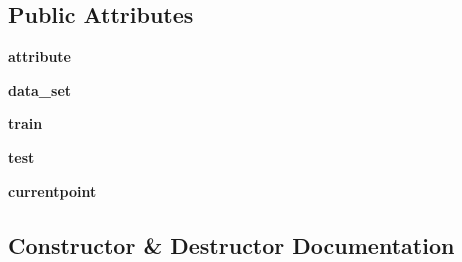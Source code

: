 \subsection*{Public Attributes}
\begin{DoxyCompactItemize}
\item 
{\bfseries attribute}\hypertarget{classSAD_1_1Stream__Generator_1_1Timestamp__Dataset__Generator_1_1Timestamp__Dataset__Generator_a77dc048aff9875af9d478bfa6d5c680a}{}\label{classSAD_1_1Stream__Generator_1_1Timestamp__Dataset__Generator_1_1Timestamp__Dataset__Generator_a77dc048aff9875af9d478bfa6d5c680a}

\item 
{\bfseries data\+\_\+set}\hypertarget{classSAD_1_1Stream__Generator_1_1Timestamp__Dataset__Generator_1_1Timestamp__Dataset__Generator_ab1bdb5529eb6edc42ce43e13c71be837}{}\label{classSAD_1_1Stream__Generator_1_1Timestamp__Dataset__Generator_1_1Timestamp__Dataset__Generator_ab1bdb5529eb6edc42ce43e13c71be837}

\item 
{\bfseries train}\hypertarget{classSAD_1_1Stream__Generator_1_1Timestamp__Dataset__Generator_1_1Timestamp__Dataset__Generator_a73370fa0c7986c8276620a6b5a51f384}{}\label{classSAD_1_1Stream__Generator_1_1Timestamp__Dataset__Generator_1_1Timestamp__Dataset__Generator_a73370fa0c7986c8276620a6b5a51f384}

\item 
{\bfseries test}\hypertarget{classSAD_1_1Stream__Generator_1_1Timestamp__Dataset__Generator_1_1Timestamp__Dataset__Generator_a3bcec36535916c3612b95170ceda9395}{}\label{classSAD_1_1Stream__Generator_1_1Timestamp__Dataset__Generator_1_1Timestamp__Dataset__Generator_a3bcec36535916c3612b95170ceda9395}

\item 
{\bfseries currentpoint}\hypertarget{classSAD_1_1Stream__Generator_1_1Timestamp__Dataset__Generator_1_1Timestamp__Dataset__Generator_aef08bd78c60a37ad6edb1c393845943c}{}\label{classSAD_1_1Stream__Generator_1_1Timestamp__Dataset__Generator_1_1Timestamp__Dataset__Generator_aef08bd78c60a37ad6edb1c393845943c}

\end{DoxyCompactItemize}


\subsection{Constructor \& Destructor Documentation}
